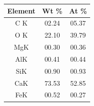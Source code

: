 \begin{minipage}{\textwidth}
\begin{minipage}[b]{0.32\textwidth}
\begin{tabular}{|c|c|c|}
      Element & Wt \% & At \% \\ \hline
      C K     & 02.24 & 05.37 \\ \hline
      O K     & 22.10 & 39.79 \\ \hline
      MgK     & 00.30 & 00.36 \\ \hline
      AlK     & 00.41 & 00.44 \\ \hline
      SiK     & 00.90 & 00.93 \\ \hline
      CaK     & 73.53 & 52.85 \\ \hline
      FeK     & 00.52 & 00.27 \\ \hline
    \end{tabular}
    \label{tab:00-05}
  \end{minipage}
\end{minipage}

